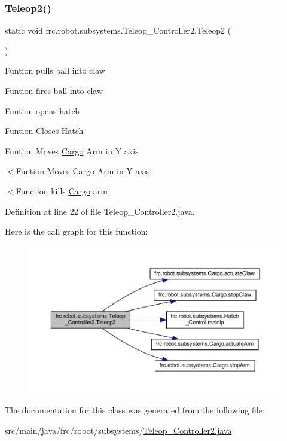 \subsubsection{\texorpdfstring{Teleop2()}{Teleop2()}}
{\footnotesize\ttfamily static void frc.\+robot.\+subsystems.\+Teleop\+\_\+\+Controller2.\+Teleop2 (\begin{DoxyParamCaption}{ }\end{DoxyParamCaption})\hspace{0.3cm}{\ttfamily [static]}}

Funtion pulls ball into claw

Funtion fires ball into claw

Funtion opens hatch

Funtion Closes Hatch

Funtion Moves \hyperlink{classfrc_1_1robot_1_1subsystems_1_1_cargo}{Cargo} Arm in Y axis

$<$Funtion Moves \hyperlink{classfrc_1_1robot_1_1subsystems_1_1_cargo}{Cargo} Arm in Y axis

$<$Function kills \hyperlink{classfrc_1_1robot_1_1subsystems_1_1_cargo}{Cargo} arm 

Definition at line 22 of file Teleop\+\_\+\+Controller2.\+java.

Here is the call graph for this function\+:\nopagebreak
\begin{figure}[H]
\begin{center}
\leavevmode
\includegraphics[width=350pt]{d3/d14/classfrc_1_1robot_1_1subsystems_1_1_teleop___controller2_a2943912b4181f00e084af67a56f6837f_cgraph}
\end{center}
\end{figure}


The documentation for this class was generated from the following file\+:\begin{DoxyCompactItemize}
\item 
src/main/java/frc/robot/subsystems/\hyperlink{_teleop___controller2_8java}{Teleop\+\_\+\+Controller2.\+java}\end{DoxyCompactItemize}
